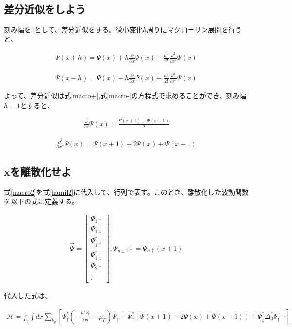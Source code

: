 \documentclass{jsarticle}
\begin{document}
		\subsection{差分近似をしよう}
		刻み幅を1として、差分近似をする。微小変化$h$周りにマクローリン展開を行うと、
		
		\begin{align}
			\Psi\left(x+h\right)=\Psi\left(x\right)+h\frac{\partial}{\partial x}\Psi\left(x\right)+\frac{h^2}{2!}\frac{\partial^2}{\partial x^2}\Psi\left(x\right)
			\label{macro+}
		\end{align}
		
		\begin{align}
			\Psi\left(x-h\right)=\Psi\left(x\right)-h\frac{\partial}{\partial x}\Psi\left(x\right)+\frac{h^2}{2!}\frac{\partial^2}{\partial x^2}\Psi\left(x\right)
			\label{macro-}
		\end{align}
		
		よって、差分近似は式\eqref{macro+},式\eqref{macro-}の方程式で求めることができ、刻み幅$h=1$とすると、
		
		\begin{align}
			\frac{\partial}{\partial x}\Psi\left(x\right)=
			\frac{\Psi\left(x+1\right)-\Psi\left(x-1\right)}{2}
		\end{align}
		
		\begin{align}
			\frac{\partial^2}{\partial x^2}\Psi\left(x\right)=
			\Psi\left(x+1\right)-2\Psi\left(x\right)+\Psi\left(x-1\right)
			\label{macro2}
		\end{align}
		
		\subsection{xを離散化せよ}
		式\eqref{macro2}を式\eqref{hamil2}に代入して、行列で表す。このとき、離散化した波動関数を以下の式に定義する。
		
		\begin{align}
			\vec{\Psi}=
			\begin{bmatrix}
				\Psi_{1\uparrow} \\
				\Psi_{1\downarrow} \\
				\Psi_{1\uparrow}^\dagger \\
				\Psi_{1\downarrow}^\dagger \\
				\Psi_{2\uparrow} \\
				\cdot \\
				\cdot
			\end{bmatrix},
			\Psi_{n\pm 1\uparrow}=\Psi_{n\uparrow}\left(x\pm 1\right)
		\end{align}
		
		代入した式は、
		
		\begin{align}
			\mathcal{H}= \frac{1}{L_y}\int dx \sum_{k_y}
			\left[ \Psi_\uparrow^\ast \left( -\frac{\hbar^2k_y^2}{2m}-\mu_F \right)\Psi_\uparrow
			+\Psi_\uparrow^\ast \left( \Psi\left(x+1\right)-2\Psi\left(x\right)+\Psi\left(x-1\right)
			\right)+\Psi_\downarrow^\ast \Delta_0^\ast \Psi_\uparrow \cdots
			\right] 
			\label{hamil3}
		\end{align}
		
		
		
\end{document}
